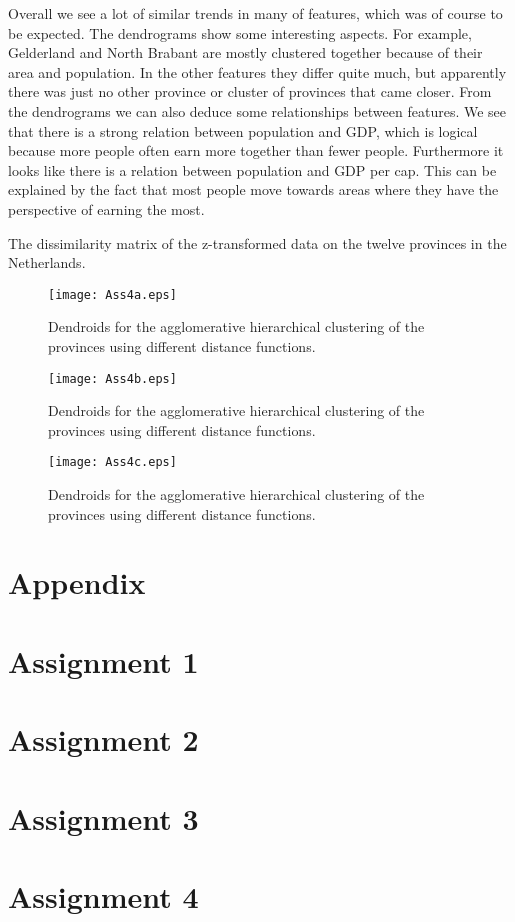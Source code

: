 \documentclass[10pt]{article}
\begin{document}
Overall we see a lot of similar trends in many of features, which was of course to be expected. The dendrograms show some interesting aspects. For example, Gelderland and North Brabant are mostly clustered together because of their area and population. In the other features they differ quite much, but apparently there was just no other province or cluster of provinces that came closer. From the dendrograms we can also deduce some relationships between features. We see that there is a strong relation between population and GDP, which is logical because more people often earn more together than fewer people. Furthermore it looks like there is a relation between population and GDP per cap. This can be explained by the fact that most people move towards areas where they have the perspective of earning the most.

\begin{table}
	\centering
	\caption{The dissimilarity matrix of the z-transformed data on the twelve provinces in the Netherlands.}
	\label{tab4}
\end{table}

\begin{figure}
	\texttt{[image: Ass4a.eps]}
	\caption{Dendroids for the agglomerative hierarchical clustering of the provinces using different distance functions.}
	\label{fig4a}
\end{figure}
\begin{figure}
	\texttt{[image: Ass4b.eps]}
	\caption{Dendroids for the agglomerative hierarchical clustering of the provinces using different distance functions.}
	\label{fig4b}
\end{figure}
\begin{figure}
	\texttt{[image: Ass4c.eps]}
	\caption{Dendroids for the agglomerative hierarchical clustering of the provinces using different distance functions.}
	\label{fig4c}
\end{figure}

\newpage
\section*{Appendix}
\appendix
\section{Assignment 1}
{\label{Minkowski}}
\section{Assignment 2}
{\label{Ass2}}
\section{Assignment 3}
{\label{Ass3}}
\section{Assignment 4}
{\label{Ass4}}
\end{document}
